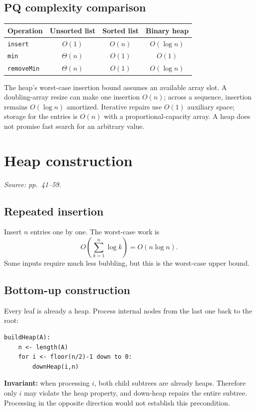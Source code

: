 \documentclass[11pt]{article}
\begin{document}
\subsection{PQ complexity comparison}
\begin{center}
\begin{tabular}{lccc}
\toprule
Operation & Unsorted list & Sorted list & Binary heap\\
\midrule
\texttt{insert} & $O(1)$ & $O(n)$ & $O(\log n)$\\
\texttt{min} & $\Theta(n)$ & $O(1)$ & $O(1)$\\
\texttt{removeMin} & $\Theta(n)$ & $O(1)$ & $O(\log n)$\\
\bottomrule
\end{tabular}
\end{center}
The heap's worst-case insertion bound assumes an available array slot. A doubling-array resize can make one insertion $O(n)$; across a sequence, insertion remains $O(\log n)$ amortized. Iterative repairs use $O(1)$ auxiliary space; storage for the entries is $O(n)$ with a proportional-capacity array. A heap does not promise fast search for an arbitrary value.

\section{Heap construction}
\textit{Source: pp.\ 41--59.}

\subsection{Repeated insertion}
Insert $n$ entries one by one. The worst-case work is
\[
O\!\left(\sum_{k=1}^n\log k\right)=O(n\log n).
\]
Some inputs require much less bubbling, but this is the worst-case upper bound.

\subsection{Bottom-up construction}
Every leaf is already a heap. Process internal nodes from the last one back to the root:
\begin{lstlisting}
buildHeap(A):
    n <- length(A)
    for i <- floor(n/2)-1 down to 0:
        downHeap(i,n)
\end{lstlisting}
\textbf{Invariant:} when processing $i$, both child subtrees are already heaps. Therefore only $i$ may violate the heap property, and down-heap repairs the entire subtree. Processing in the opposite direction would not establish this precondition.
\end{document}
